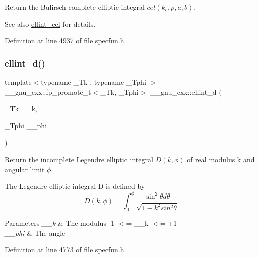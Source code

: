 Return the Bulirsch complete elliptic integral $ cel(k_c,p,a,b) $.

\begin{DoxySeeAlso}{See also}
\hyperlink{group__mathsf__gnu_ga6e44a0d90500e56ef4b3aba6efd7e2b0}{ellint\+\_\+cel} for details. 
\end{DoxySeeAlso}


Definition at line 4937 of file specfun.\+h.

\mbox{\label{group__mathsf__gnu_gad75103894786e6d7766bac4d8447b6cc}} 
\subsubsection{\texorpdfstring{ellint\+\_\+d()}{ellint\_d()}}
{\footnotesize\ttfamily template$<$typename \+\_\+\+Tk , typename \+\_\+\+Tphi $>$ \\
\+\_\+\+\_\+gnu\+\_\+cxx\+::fp\+\_\+promote\+\_\+t$<$\+\_\+\+Tk, \+\_\+\+Tphi$>$ \+\_\+\+\_\+gnu\+\_\+cxx\+::ellint\+\_\+d (\begin{DoxyParamCaption}\item[{\+\_\+\+Tk}]{\+\_\+\+\_\+k,  }\item[{\+\_\+\+Tphi}]{\+\_\+\+\_\+phi }\end{DoxyParamCaption})\hspace{0.3cm}{\ttfamily [inline]}}

Return the incomplete Legendre elliptic integral $ D(k,\phi) $ of real modulus {\ttfamily k} and angular limit $ \phi $.

The Legendre elliptic integral D is defined by \[ D(k,\phi) = \int_0^\phi \frac{\sin^2\theta d\theta}{\sqrt{1-k^2sin^2\theta}} \]


\begin{DoxyParams}{Parameters}
{\em \+\_\+\+\_\+k} & The modulus {\ttfamily -\/1 $<$= \+\_\+\+\_\+k $<$= +1} \\
\hline
{\em \+\_\+\+\_\+phi} & The angle \\
\hline
\end{DoxyParams}


Definition at line 4773 of file specfun.\+h.

\mbox{\label{group__mathsf__gnu_ga02ed50be21fdd84ad6bed003f94a9e69}} 
